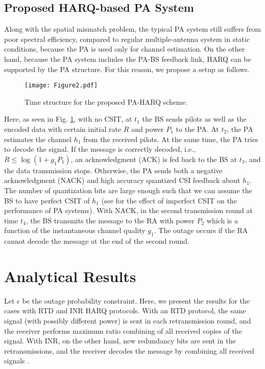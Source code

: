 \subsection{Proposed HARQ-based PA System}
Along with the spatial mismatch problem, the typical PA system  still suffers from poor spectral efficiency, compared to regular multiple-antenna system in static conditions, because the PA is used only for channel estimation. On the other hand, because the PA system includes the PA-BS feedback link,  HARQ can be supported by the PA structure. For this reason, we propose a setup as follows.

\begin{figure}
\centering
  \texttt{[image: Figure2.pdf]}\\
\caption{Time structure for the proposed PA-HARQ scheme.}\label{fig_timeslot}
\end{figure}

Here, as  seen in Fig. \ref{fig_timeslot}, with no CSIT, at $t_1$ the BS sends pilots as well as the encoded data with certain initial rate $R$ and power $P_1$ to the PA. At $t_2$, the PA estimates the channel $h_1$ from the received pilots. At the same time, the PA tries to decode the signal. If the message is correctly decoded, i.e., $R\leq \log(1+g_1P_1)$,  an acknowledgment (ACK) is fed back to the BS at $t_3$, and the data transmission stops. Otherwise, the PA sends both a negative acknowledgment (NACK) and high accuracy quantized CSI feedback about $h_1$. The number of quantization bits are large enough such that we can assume the BS to have perfect CSIT of $h_1$ (see \cite{guo2020semilinear} for the effect of imperfect CSIT on the performance of PA systems). With NACK, in the second transmission round at time $t_4$, the BS  transmits the message to the RA with power $P_2$  which is a function of the instantaneous channel quality $g_1$. The outage occurs if the RA cannot decode the message at the end of the second round. 

\section{Analytical Results}
Let $\epsilon$ be the outage probability constraint. Here, we present the results for the cases with RTD and INR HARQ protocols. With an RTD protocol, the same signal (with possibly different power) is sent in each retransmission round, and the receiver performs maximum ratio combining of all received copies of the signal. With INR, on the other hand, new redundancy bits are sent in the retransmissions, and the receiver decodes the message by combining all received signals \cite{makki2014green,chaitanya2011outage,djonin2008joint}.

